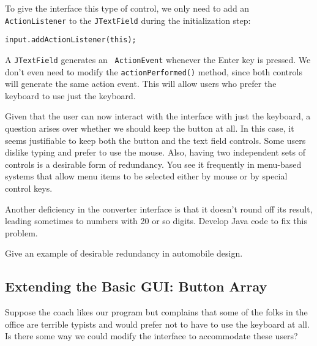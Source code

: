 To give the interface this type of control, we only need to add an
{\tt ActionLis\-tener} to the {\tt JTextField} during the initialization
step:

\begin{jjjlisting}
\begin{lstlisting}
input.addActionListener(this);
\end{lstlisting}
\end{jjjlisting}

\noindent A {\tt JTextField} generates an {\tt
ActionEvent} whenever the Enter key is pressed.  We don't even need to
modify the {\tt actionPerformed()} method, since both controls will
generate the same action event.  This will allow users who prefer the
keyboard to use just the keyboard.


\noindent Given that the user can now interact with the
interface with just the keyboard, a question arises over whether we
should keep the button at all.  In this case, it seems justifiable to
keep both the button and the text field controls.  Some users dislike
typing and prefer to use the mouse.  Also, having two independent sets
of controls is a desirable form of redundancy.  You see it frequently
in menu-based systems that allow menu items to be selected either by
mouse or by special control keys.


\begin{SSTUDY}

\item  Another deficiency in the converter interface is that it doesn't round
off its result, leading sometimes to numbers with 20 or so
digits.  Develop Java code to fix this problem.


\item  Give an example of desirable redundancy in automobile design.

\end{SSTUDY}

\subsection{Extending the Basic GUI: Button Array}
\label{sec-keypad}
\noindent Suppose the coach likes our program but complains that some of the
folks in the office are terrible typists and would prefer not to have
to use the keyboard at all.  Is there some way we could modify the
interface to accommodate these users?


